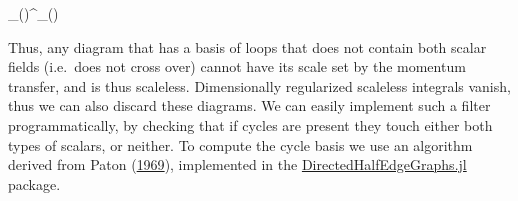 \documentclass[
  11pt,
  a4paper,
  DIV=11,
  numbers=noendperiod,
  oneside]{scrreprt}
\let\[\relax \let\]\relax %
\DeclareRobustCommand{\[}{\begin{equation}}
\DeclareRobustCommand{\]}{\end{equation}}
\begin{document}
\[
_()\lambda^\eta {}_()
\]

Thus, any diagram that has a basis of loops that does not contain both
scalar fields (i.e.~does not cross over) cannot have its scale set by
the momentum transfer, and is thus scaleless. Dimensionally regularized
scaleless integrals vanish, thus we can also discard these diagrams. We
can easily implement such a filter programmatically, by checking that if
cycles are present they touch either both types of scalars, or neither.
To compute the cycle basis we use an algorithm derived from Paton
(\protect\hyperlink{ref-Paton:1969}{1969}), implemented in the
\href{https://github.com/lcnhb/DirectedHalfEdgeGraphs.jl}{DirectedHalfEdgeGraphs.jl}
package.
\end{document}
